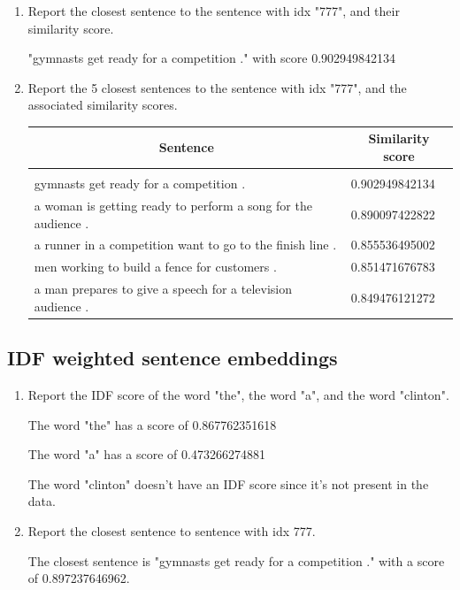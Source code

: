 \documentclass{article} %
\begin{document}
\begin{enumerate}
    \item
    Report the closest sentence to the sentence with idx "777", and their
    similarity score.

    "gymnasts get ready for a competition ." with score 0.902949842134

    \item
    Report the 5 closest sentences to the sentence with idx "777", and the
    associated similarity scores.

    \begin{table}[h]
    \label{sample-table}
    \begin{center}
    \begin{tabular}{ll}
    \multicolumn{1}{c}{\bf Sentence} & \multicolumn{1}{c}{\bf Similarity score}
    \\ \hline \\
    gymnasts get ready for a competition . & 0.902949842134 \\
    a woman is getting ready to perform a song for the audience . & 0.890097422822 \\
    a runner in a competition want to go to the finish line . & 0.855536495002 \\
    men working to build a fence for customers . & 0.851471676783 \\
    a man prepares to give a speech for a television audience . & 0.849476121272 \\
    \end{tabular}
    \end{center}
    \end{table}
\end{enumerate}

\subsection{IDF weighted sentence embeddings}

\begin{enumerate}
    \item
    Report the IDF score of the word "the", the word "a", and the word "clinton".

    The word "the" has a score of 0.867762351618

    The word "a" has a score of 0.473266274881

    The word "clinton" doesn't have an IDF score since it's not present in the data.

    \item
    Report the closest sentence to sentence with idx 777.

    The closest sentence is "gymnasts get ready for a competition ." with a score of 0.897237646962.
\end{enumerate}
\end{document}
